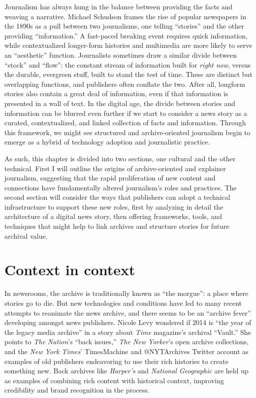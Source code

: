 Journalism has always hung in the balance between providing the facts and weaving a narrative. Michael Schudson frames the rise of popular newspapers in the 1890s as a pull between two journalisms, one telling ``stories'' and the other providing ``information.'' A fast-paced breaking event requires quick information, while contextualized longer-form histories and multimedia are more likely to serve an ``aesthetic'' function.\autocite[89]{schudson_discovering_1978} Journalists sometimes draw a similar divide between ``stock'' and ``flow'': the constant stream of information built for \emph{right now}, versus the durable, evergreen stuff, built to stand the test of time.\autocite{sloan_stock_2010} These are distinct but overlapping functions, and publishers often conflate the two. After all, longform stories also contain a great deal of information, even if that information is presented in a wall of text. In the digital age, the divide between stories and information can be blurred even further if we start to consider a news story as a curated, contextualized, and linked collection of facts and information. Through this framework, we might see structured and archive-oriented journalism begin to emerge as a hybrid of technology adoption and journalistic practice.

As such, this chapter is divided into two sections, one cultural and the other technical. First I will outline the origins of archive-oriented and explainer journalism, suggesting that the rapid proliferation of new content and connections have fundamentally altered journalism's roles and practices. The second section will consider the ways that publishers can adopt a technical infrastructure to support these new roles, first by analyzing in detail the architecture of a digital news story, then offering frameworks, tools, and techniques that might help to link archives and structure stories for future archival value.

\section{Context in context}

In newsrooms, the archive is traditionally known as ``the morgue'': a place where stories go to die. But new technologies and conditions have led to many recent attempts to reanimate the news archive, and there seems to be an ``archive fever'' developing amongst news publishers. Nicole Levy wondered if 2014 is ``the year of the legacy media archive'' in a story about \emph{Time} magazine's archival ``Vault.''\autocite{levy_time.com_2014} She points to \emph{The Nation}'s ``back issues,'' \emph{The New Yorker}'s open archive collections, and the \emph{New York Times}' TimesMachine and @NYTArchives Twitter account as examples of old publishers endeavoring to use their rich histories to create something new. Back archives like \emph{Harper's} and \emph{National Geographic} are held up as examples of combining rich content with historical context, improving credibility and brand recognition in the process.

